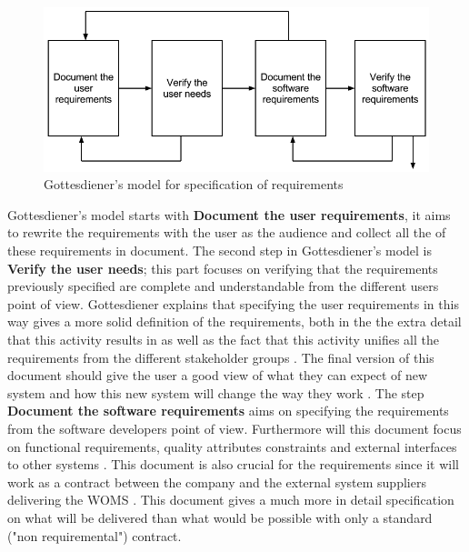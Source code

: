 \documentclass[a4paper]{article}
\begin{document}
\begin{figure}[H]
	\centering
		\includegraphics[width=1\textwidth]{images/specifications_model.png}
	\caption{Gottesdiener's model for specification of requirements \cite{gott5}}
	\label{figure:specifications}
\end{figure}


Gottesdiener's model starts with \textbf{Document the user requirements}, it aims to rewrite the requirements with the user as the audience and collect all the of these requirements in document. The second step in Gottesdiener's model is \textbf{Verify the user needs}; this part focuses on verifying that the requirements previously specified are complete and understandable from the different users point of view. Gottesdiener explains that specifying the user requirements in this way gives a more solid definition of the requirements, both in the the extra detail that this activity results in as well as the fact that this activity unifies all the requirements from the different stakeholder groups \cite{gott5}. The final version of this document should give the user a good view of what they can expect of new system and how this new system will change the way they work \cite{gott5}. The step \textbf{Document the software requirements} aims on specifying the requirements from the software developers point of view. Furthermore will this document focus on functional requirements, quality attributes constraints and external interfaces to other systems \cite{gott5}. This document is also crucial for the requirements since it will work as a contract between the company and the external system suppliers delivering the WOMS \cite{gott5}. This document gives a much more in detail specification on what will be delivered than what would be possible with only a standard ("non requiremental") contract. 
\end{document}
